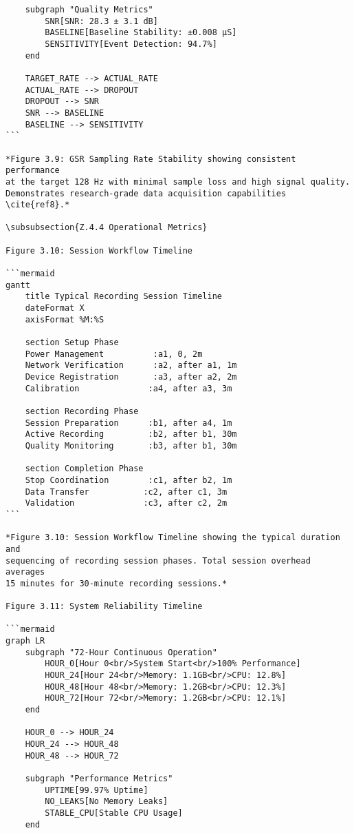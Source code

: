 \begin{verbatim}
    subgraph "Quality Metrics"
        SNR[SNR: 28.3 ± 3.1 dB]
        BASELINE[Baseline Stability: ±0.008 μS]
        SENSITIVITY[Event Detection: 94.7%]
    end

    TARGET_RATE --> ACTUAL_RATE
    ACTUAL_RATE --> DROPOUT
    DROPOUT --> SNR
    SNR --> BASELINE
    BASELINE --> SENSITIVITY
```

*Figure 3.9: GSR Sampling Rate Stability showing consistent performance
at the target 128 Hz with minimal sample loss and high signal quality.
Demonstrates research-grade data acquisition capabilities \cite{ref8}.*

\subsubsection{Z.4.4 Operational Metrics}

Figure 3.10: Session Workflow Timeline

```mermaid
gantt
    title Typical Recording Session Timeline
    dateFormat X
    axisFormat %M:%S

    section Setup Phase
    Power Management          :a1, 0, 2m
    Network Verification      :a2, after a1, 1m
    Device Registration       :a3, after a2, 2m
    Calibration              :a4, after a3, 3m

    section Recording Phase
    Session Preparation      :b1, after a4, 1m
    Active Recording         :b2, after b1, 30m
    Quality Monitoring       :b3, after b1, 30m

    section Completion Phase
    Stop Coordination        :c1, after b2, 1m
    Data Transfer           :c2, after c1, 3m
    Validation              :c3, after c2, 2m
```

*Figure 3.10: Session Workflow Timeline showing the typical duration and
sequencing of recording session phases. Total session overhead averages
15 minutes for 30-minute recording sessions.*

Figure 3.11: System Reliability Timeline

```mermaid
graph LR
    subgraph "72-Hour Continuous Operation"
        HOUR_0[Hour 0<br/>System Start<br/>100% Performance]
        HOUR_24[Hour 24<br/>Memory: 1.1GB<br/>CPU: 12.8%]
        HOUR_48[Hour 48<br/>Memory: 1.2GB<br/>CPU: 12.3%]
        HOUR_72[Hour 72<br/>Memory: 1.2GB<br/>CPU: 12.1%]
    end

    HOUR_0 --> HOUR_24
    HOUR_24 --> HOUR_48
    HOUR_48 --> HOUR_72

    subgraph "Performance Metrics"
        UPTIME[99.97% Uptime]
        NO_LEAKS[No Memory Leaks]
        STABLE_CPU[Stable CPU Usage]
    end


\end{verbatim}
